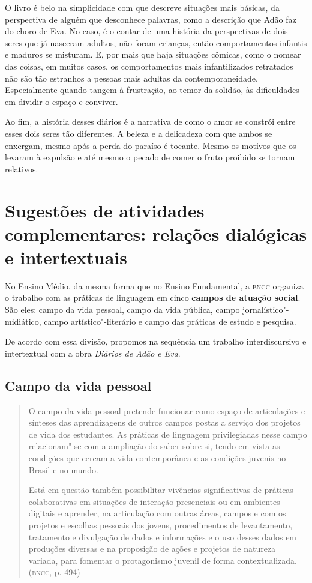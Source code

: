 \documentclass{extarticle}
\begin{document}
O livro é belo na simplicidade com que descreve situações mais básicas,
da perspectiva de alguém que desconhece palavras, como a descrição que
Adão faz do choro de Eva. No caso, é o contar de uma história da
perspectivas de dois seres que já nasceram adultos, não foram crianças,
então comportamentos infantis e maduros se misturam. E, por mais que
haja situações cômicas, como o nomear das coisas, em muitos casos, os
comportamentos mais infantilizados retratados não são tão estranhos a
pessoas mais adultas da contemporaneidade. Especialmente quando tangem à
frustração, ao temor da solidão, às dificuldades em dividir o espaço e
conviver.

Ao fim, a história desses diários é a narrativa de como o amor se
constrói entre esses dois seres tão diferentes. A beleza e a delicadeza
com que ambos se enxergam, mesmo após a perda do paraíso é tocante.
Mesmo os motivos que os levaram à expulsão e até mesmo o pecado de comer
o fruto proibido se tornam relativos.

\section{Sugestões de atividades complementares: relações dialógicas e
intertextuais}


No Ensino Médio, da mesma forma que no Ensino Fundamental, a \textsc{bncc}
organiza o trabalho com as práticas de linguagem em cinco \textbf{campos
de atuação social}. São eles: campo da vida pessoal, campo da vida
pública, campo jornalístico"-midiático, campo artístico"-literário e campo
das práticas de estudo e pesquisa.

De acordo com essa divisão, propomos na sequência um trabalho
interdiscursivo e intertextual com a obra \emph{Diários de Adão e Eva}.

\subsection{Campo da vida pessoal}

\begin{quote}
O campo da vida pessoal pretende funcionar como espaço de articulações
e sínteses das aprendizagens de outros campos postas a serviço dos
projetos de vida dos estudantes. As práticas de linguagem privilegiadas
nesse campo relacionam"-se com a ampliação do saber sobre si, tendo em
vista as condições que cercam a vida contemporânea e as condições
juvenis no Brasil e no mundo.

Está em questão também possibilitar vivências significativas de práticas
colaborativas em situações de interação presenciais ou em ambientes
digitais e aprender, na articulação com outras áreas, campos e com os
projetos e escolhas pessoais dos jovens, procedimentos de levantamento,
tratamento e divulgação de dados e informações e o uso desses dados em
produções diversas e na proposição de ações e projetos de natureza
variada, para fomentar o protagonismo juvenil de forma
contextualizada. (\textsc{bncc}, p. 494)
\end{quote}
\end{document}
